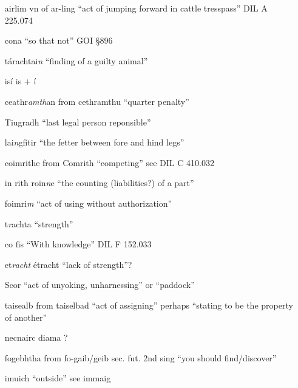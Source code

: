 \documentclass[11pt]{article}
\begin{document}
\begin{enumerate}
  \item[airlim] vn of ar-ling \enquote{act of jumping forward in cattle tresspass} DIL A 225.074

  \item[cona] \enquote{so that not} GOI \S 896

  \item[t\'{a}rachtai\emph{n}] \enquote{finding of a guilty animal}

  \item[is\'{i}] is + \'{i}

  \item[ceathr\emph{amth}an] from cethramthu \enquote{quarter penalty}

  \item[Tiugradh] \enquote{last legal person reponsible}

  \item[lai\emph{n}gfitir] \enquote{the fetter between fore and hind legs}

  \item[coimrithe] from Comrith \enquote{competing} see DIL C 410.032

  \item[in rith roin\emph{n}e] \enquote{the counting (liabilities?) of a part}

  \item[foimri\emph{m}] \enquote{act of using without authorization}
  
  \item[t\emph{r}achta] \enquote{strength}

  \item[co fis] \enquote{With knowledge} DIL F 152.033

  \item[et\emph{racht}] \'{e}tracht \enquote{lack of strength}?

  \item[Scor] \enquote{act of unyoking, unharnessing} or \enquote{paddock}

  \item[taisealb] from taiselbad \enquote{act of assigning} perhaps \enquote{stating to be the property of another}
 
  \item[necnairc diama] ?

  \item[fogebhtha] from fo-gaib/geib sec. fut. 2nd sing \enquote{you should find/discover}

  \item[imuich] \enquote{outside} see immaig
  

\end{enumerate}
\end{document}

